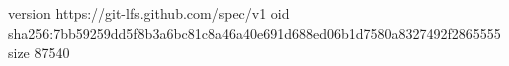 version https://git-lfs.github.com/spec/v1
oid sha256:7bb59259dd5f8b3a6bc81c8a46a40e691d688ed06b1d7580a8327492f2865555
size 87540

